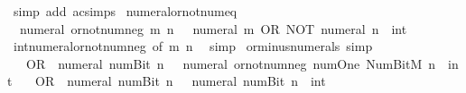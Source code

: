\begin{isabellebody}
\ {\isacharparenleft}{\kern0pt}simp\ add{\isacharcolon}{\kern0pt}\ ac{\isacharunderscore}{\kern0pt}simps{\isacharparenright}{\kern0pt}%
\endisatagproof
{\isafoldproof}%
%
\isadelimproof
\isanewline
%
\endisadelimproof
\isanewline
{}\isamarkupfalse%
\ numeral{\isacharunderscore}{\kern0pt}or{\isacharunderscore}{\kern0pt}not{\isacharunderscore}{\kern0pt}num{\isacharunderscore}{\kern0pt}eq{\isacharcolon}{\kern0pt}\isanewline
\ \ {\isacartoucheopen}numeral\ {\isacharparenleft}{\kern0pt}or{\isacharunderscore}{\kern0pt}not{\isacharunderscore}{\kern0pt}num{\isacharunderscore}{\kern0pt}neg\ m\ n{\isacharparenright}{\kern0pt}\ {\isacharequal}{\kern0pt}\ {\isacharminus}{\kern0pt}\ {\isacharparenleft}{\kern0pt}numeral\ m\ OR\ NOT\ {\isacharparenleft}{\kern0pt}numeral\ n\ {\isacharcolon}{\kern0pt}{\isacharcolon}{\kern0pt}\ int{\isacharparenright}{\kern0pt}{\isacharparenright}{\kern0pt}{\isacartoucheclose}\isanewline
%
\isadelimproof
\ \ %
\endisadelimproof
%
\isatagproof
{}\isamarkupfalse%
\ int{\isacharunderscore}{\kern0pt}numeral{\isacharunderscore}{\kern0pt}or{\isacharunderscore}{\kern0pt}not{\isacharunderscore}{\kern0pt}num{\isacharunderscore}{\kern0pt}neg\ {\isacharbrackleft}{\kern0pt}of\ m\ n{\isacharbrackright}{\kern0pt}\ \isamarkupfalse%
\ simp%
\endisatagproof
{\isafoldproof}%
%
\isadelimproof
\isanewline
%
\endisadelimproof
\isanewline
{}\isamarkupfalse%
\ or{\isacharunderscore}{\kern0pt}minus{\isacharunderscore}{\kern0pt}numerals\ {\isacharbrackleft}{\kern0pt}simp{\isacharbrackright}{\kern0pt}{\isacharcolon}{\kern0pt}\isanewline
\ \ {\isacartoucheopen}{}\ OR\ {\isacharminus}{\kern0pt}\ {\isacharparenleft}{\kern0pt}numeral\ {\isacharparenleft}{\kern0pt}num{\isachardot}{\kern0pt}Bit{}\ n{\isacharparenright}{\kern0pt}{\isacharparenright}{\kern0pt}\ {\isacharequal}{\kern0pt}\ {\isacharminus}{\kern0pt}\ {\isacharparenleft}{\kern0pt}numeral\ {\isacharparenleft}{\kern0pt}or{\isacharunderscore}{\kern0pt}not{\isacharunderscore}{\kern0pt}num{\isacharunderscore}{\kern0pt}neg\ num{\isachardot}{\kern0pt}One\ {\isacharparenleft}{\kern0pt}Num{\isachardot}{\kern0pt}BitM\ n{\isacharparenright}{\kern0pt}{\isacharparenright}{\kern0pt}\ {\isacharcolon}{\kern0pt}{\isacharcolon}{\kern0pt}\ int{\isacharparenright}{\kern0pt}{\isacartoucheclose}\isanewline
\ \ {\isacartoucheopen}{}\ OR\ {\isacharminus}{\kern0pt}\ {\isacharparenleft}{\kern0pt}numeral\ {\isacharparenleft}{\kern0pt}num{\isachardot}{\kern0pt}Bit{}\ n{\isacharparenright}{\kern0pt}{\isacharparenright}{\kern0pt}\ {\isacharequal}{\kern0pt}\ {\isacharminus}{\kern0pt}\ {\isacharparenleft}{\kern0pt}numeral\ {\isacharparenleft}{\kern0pt}num{\isachardot}{\kern0pt}Bit{}\ n{\isacharparenright}{\kern0pt}\ {\isacharcolon}{\kern0pt}{\isacharcolon}{\kern0pt}\ int{\isacharparenright}{\kern0pt}{\isacartoucheclose}\isanewline

\end{isabellebody}
